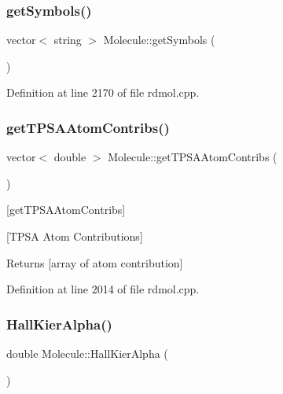 \subsubsection{\texorpdfstring{get\+Symbols()}{getSymbols()}}
{\footnotesize\ttfamily vector$<$ string $>$ Molecule\+::get\+Symbols (\begin{DoxyParamCaption}{ }\end{DoxyParamCaption})}



Definition at line 2170 of file rdmol.\+cpp.

\mbox{\label{class_molecule_ab277cc8d75ec0bfafe2e40aa3d960e4b}} 
\subsubsection{\texorpdfstring{get\+T\+P\+S\+A\+Atom\+Contribs()}{getTPSAAtomContribs()}}
{\footnotesize\ttfamily vector$<$ double $>$ Molecule\+::get\+T\+P\+S\+A\+Atom\+Contribs (\begin{DoxyParamCaption}{ }\end{DoxyParamCaption})}



\mbox{[}get\+T\+P\+S\+A\+Atom\+Contribs\mbox{]} 

\mbox{[}T\+P\+SA Atom Contributions\mbox{]} \begin{DoxyReturn}{Returns}
\mbox{[}array of atom contribution\mbox{]} 
\end{DoxyReturn}


Definition at line 2014 of file rdmol.\+cpp.

\mbox{\label{class_molecule_ab4440ddc7c396037799a37dcc6fdb497}} 
\subsubsection{\texorpdfstring{Hall\+Kier\+Alpha()}{HallKierAlpha()}}
{\footnotesize\ttfamily double Molecule\+::\+Hall\+Kier\+Alpha (\begin{DoxyParamCaption}{ }\end{DoxyParamCaption})}



